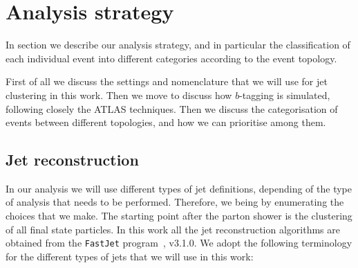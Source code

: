 
\section{Analysis strategy}
\label{sec:analysis}


In section we describe our analysis strategy, and in particular
the classification of each individual event into
different categories according to the event topology.

First of all we discuss the settings and nomenclature that
we will use for jet clustering in this work.
%
Then we move to discuss how $b$-tagging is simulated,
following closely the ATLAS techniques.
%
Then we discuss the categorisation of events between different
topologies, and how we can prioritise among them.


\subsection{Jet reconstruction}

In our analysis we will use different types of jet definitions,
depending of the type of analysis that needs to be performed.
%
Therefore, we being by enumerating the choices that we make.
%
The starting point after the parton shower is the clustering
of all final state particles.
%
In this work all the jet reconstruction algorithms
are obtained from the {\tt FastJet} program~\cite{Cacciari:2011ma},
v3.1.0.
%
We adopt the following terminology for the different types of jets
that we will use in this work:

